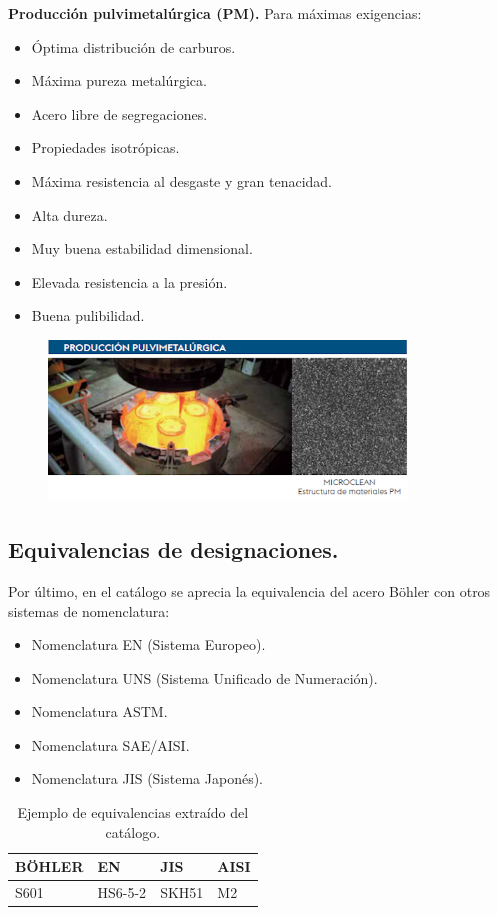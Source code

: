 \documentclass[12pt,a4paper]{article}
\begin{document}
\textbf{Producción pulvimetalúrgica (PM).} Para máximas exigencias:
\begin{itemize}
    \item Óptima distribución de carburos.
    \item Máxima pureza metalúrgica.
    \item Acero libre de segregaciones.
    \item Propiedades isotrópicas.
    \item Máxima resistencia al desgaste y gran tenacidad.
    \item Alta dureza.
    \item Muy buena estabilidad dimensional.
    \item Elevada resistencia a la presión.
    \item Buena pulibilidad.
\end{itemize}
\begin{figure}[H]    
    \centering         
    \includegraphics[width=0.85\textwidth]{Inagenes para latex/9.png}
\end{figure}

\subsection{Equivalencias de designaciones.}
Por último, en el catálogo se aprecia la equivalencia del acero Böhler con otros sistemas de nomenclatura:

\begin{itemize}
    \item Nomenclatura EN (Sistema Europeo).
    \item Nomenclatura UNS (Sistema Unificado de Numeración).
    \item Nomenclatura ASTM.
    \item Nomenclatura SAE/AISI.
    \item Nomenclatura JIS (Sistema Japonés).
\end{itemize}

\begin{table}[h!]
    \centering
    \begin{tabular}{llll}
        \hline
        \textbf{BÖHLER} & \textbf{EN} & \textbf{JIS} & \textbf{AISI} \\ \hline
        S601 & HS6-5-2 & SKH51 & M2 \\ \hline
    \end{tabular}
    \caption{Ejemplo de equivalencias extraído del catálogo.}
    \label{tab:equivalencias-bohler}
\end{table}
\end{document}
